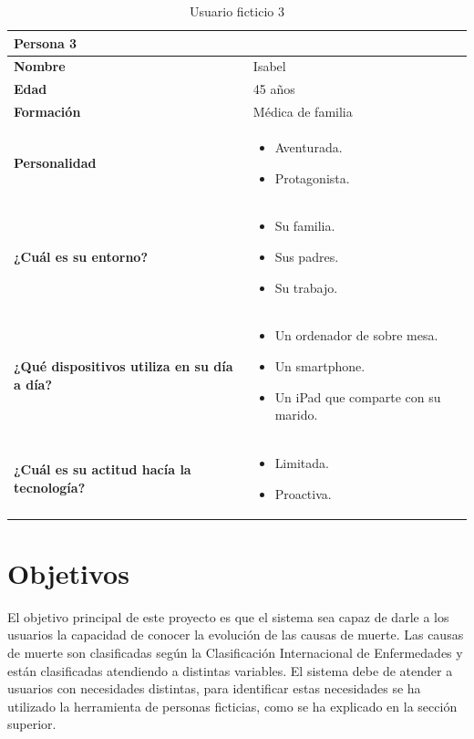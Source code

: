 \begin{table}[H]
	\begin{center}
		\begin{tabular}{| p{} |
                   p{} |}
			\hline
			Persona 3 &  \\ \hline
			\textbf{Nombre} & Isabel \\
			\textbf{Edad} & 45 años \\
			\textbf{Formación} & Médica de familia \\
			\textbf{Personalidad} & \begin{itemize}
                \item Aventurada.
                \item Protagonista.
            \end{itemize} \\
			\textbf{¿Cuál es su entorno?} & \begin{itemize}
                \item Su familia.
                \item Sus padres.
                \item Su trabajo.
            \end{itemize} \\
			\textbf{¿Qué dispositivos utiliza en su día a día?} & \begin{itemize}
                \item Un ordenador de sobre mesa.
                \item Un smartphone.
                \item Un iPad que comparte con su marido.
            \end{itemize} \\
            \textbf{¿Cuál es su actitud hacía la tecnología?} & \begin{itemize}
                \item Limitada.
                \item Proactiva.
            \end{itemize} \\
            \hline
		\end{tabular}
		\caption{Usuario ficticio 3}
	\end{center}
\end{table}


\section{Objetivos}
El objetivo principal de este proyecto es que el sistema sea capaz de darle a los usuarios la capacidad de conocer
la evolución de las causas de muerte. Las causas de muerte son clasificadas según la Clasificación Internacional
de Enfermedades y están clasificadas atendiendo a distintas variables. El sistema debe de atender a usuarios con
necesidades distintas, para identificar estas necesidades se ha utilizado la herramienta de personas ficticias,
como se ha explicado en la sección superior.